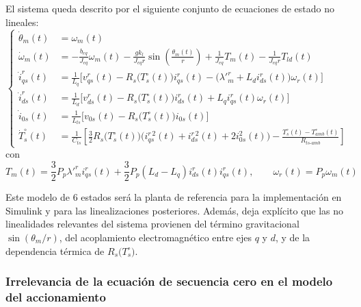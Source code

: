 \documentclass[12pt, a4paper,journal, onecolumn, compsoc]{IEEEtran}
\begin{document}
    El sistema queda descrito por el siguiente conjunto de ecuaciones de estado no lineales:
    \begin{equation}
    \left\{
        \begin{aligned}
            \dot{\theta}_m(t) &= \omega_m(t) \\[6pt]
            \dot{\omega}_m(t) &= -\frac{b_{eq}}{J_{eq}}\omega_m(t)-\frac{gk_l}{J_{eq}r}\sin\left(\frac{\theta_m(t)}{r}\right)+\frac{1}{J_{eq}}T_m(t)-\frac{1}{J_{eq}r}T_{ld}(t) \\[6pt]
            \dot{i}_{qs}^r(t) &= \frac{1}{L_q}\Big[v_{qs}^r(t)-R_s\big(T_s^\circ(t)\big)i_{qs}^r(t)-\big(\lambda'^r_m+L_d i_{ds}^r(t)\big)\omega_r(t)\Big] \\[6pt]
            \dot{i}_{ds}^r(t) &= \frac{1}{L_d}\Big[v_{ds}^r(t)-R_s\big(T_s^\circ(t)\big)i_{ds}^r(t)+L_q i_{qs}^r(t)\omega_r(t)\Big] \\[6pt]
            \dot{i}_{0s}(t) &= \frac{1}{L_{ls}}\Big[v_{0s}(t)-R_s\big(T_s^\circ(t)\big)i_{0s}(t)\Big] \\[6pt]
            \dot{T}_s^\circ(t) &= \frac{1}{C_{ts}}\left[\frac{3}{2}R_s\big(T_s^\circ(t)\big)\Big(i_{qs}^{r\,2}(t)+i_{ds}^{r\,2}(t)+2i_{0s}^{2}(t)\Big)-\frac{T_s^\circ(t)-T_{amb}^\circ(t)}{R_{ts\text{-}amb}}\right]
        \end{aligned}
    \right.
    \end{equation}
    con
    \begin{equation}
        T_m(t)=\frac{3}{2} P_p \lambda'^r_m i_{qs}^r(t)+\frac{3}{2}P_p(L_d-L_q)i_{ds}^r(t)i_{qs}^r(t),
        \qquad
        \omega_r(t)=P_p\omega_m(t)
    \end{equation}

    Este modelo de 6 estados será la planta de referencia para la implementación en Simulink y para las linealizaciones posteriores. Además, deja explícito que las no linealidades relevantes del sistema provienen del término gravitacional \(\sin(\theta_m/r)\), del acoplamiento electromagnético entre ejes \(q\) y \(d\), y de la dependencia térmica de \(R_s\big(T_s^\circ\big)\).


    \subsubsection{Irrelevancia de la ecuación de secuencia cero en el modelo del accionamiento}
\end{document}
